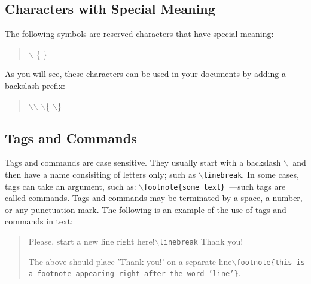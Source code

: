 \documentclass[11pt]{article}
\newcommand{\cmd}[1]{{\tt $\backslash$#1}}
\begin{document}

\subsection{Characters with Special Meaning}

The following symbols are reserved characters that have special
meaning:

\begin{quote}
$\backslash$ \{ \}
\end{quote}

\noindent As you will see, these characters can be used in your documents
by adding a backslash prefix:

\begin{quote}
$\backslash$$\backslash$ $\backslash$\{ $\backslash$\}
\end{quote}









\subsection{Tags and Commands}

Tags and commands are case sensitive. They usually start with a
backslash $\backslash$\ and then have a name consisiting of letters
only; such as \cmd{linebreak}. In some cases, tags can take an
argument, such as: \cmd{footnote\{some text\}}\ ---such tags are
called commands. Tags and commands may be terminated by a space, a
number, or any punctuation mark. The following is an example of the
use of tags and commands in text:
\begin{quote}
Please, start a new line right here!\cmd{linebreak} Thank you!

The above should place 'Thank you!' on a separate line\cmd{footnote\{this
is a footnote appearing right after the word 'line'\}}.
\end{quote}
\end{document}
